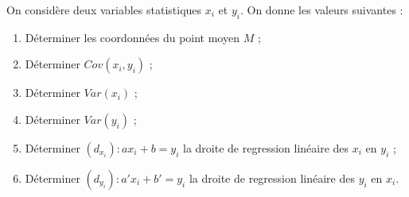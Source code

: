 \documentclass[11pt]{article}
\begin{document}
\begin{exercice}
On considère deux variables statistiques $x_i$ et $y_i$. On donne les
valeurs suivantes : 
\begin{multicols}{2}



\end{multicols}
\end{exercice}


\begin{exercice}
\begin{multicols}{2}

\begin{enumerate}
\item Déterminer les coordonnées du point moyen $M$ ;
\item Déterminer $Cov(x_i,y_i)$ ;
\item Déterminer $Var(x_i)$ ;
\item Déterminer $Var(y_i)$ ;
\item Déterminer $(d_{x_i}) : ax_i+b=y_i$ la droite de regression linéaire des $x_i$ en $y_i$ ;
\item Déterminer $(d_{y_i}) : a'x_i+b'=y_i$ la droite de regression linéaire des $y_i$ en $x_i$.
\end{enumerate}
\end{multicols}
\end{exercice}
\end{document}

